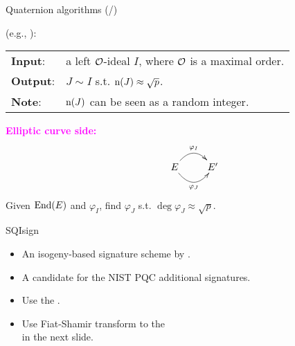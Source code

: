 \begin{frame}{Quaternion algorithms (/\algquatotal{})}

    {\large
    }
    (e.g., \cite[Algorithm 2.7.5]{Cohen2010_ccnt}):\\[5pt]
    \begin{tabular}{l l}
        \textbf{Input}: & a left $\mathcal{O}$-ideal $I$,
                            where $\mathcal{O}$ is a maximal order.\\[3pt]
        \textbf{Output}: & $J \sim I$ s.t. $\mathrm{n}(J) \approx \sqrt{p}$.\\[3pt]
        \textbf{Note}: & 
                $\mathrm{n}(J)$ can be seen as a random integer.
    \end{tabular}

    \vspace{15pt}
    \textcolor{magenta}{\textbf{Elliptic curve side:}}
    \begin{align*}
        \xymatrix{
            & E \ar@/^15pt/[r]^{\varphi_I} \ar@/_15pt/[r]_{\varphi_J}
            & E'
        }
    \end{align*}
    Given $\mathrm{End}(E)$ and $\varphi_I$,
    find $\varphi_J$ s.t. $\deg\varphi_J \approx \sqrt{p}$.
\end{frame}

\begin{frame}{SQIsign}
    \begin{itemize}
        \setlength{\itemsep}{10pt}
        \item An isogeny-based signature scheme by \cite{AC:DKLPW20}.
        \item A candidate for the NIST PQC additional signatures.
        \item Use the .
        \item Use Fiat-Shamir transform to the \\ in the next slide.
    \end{itemize}
\end{frame}

